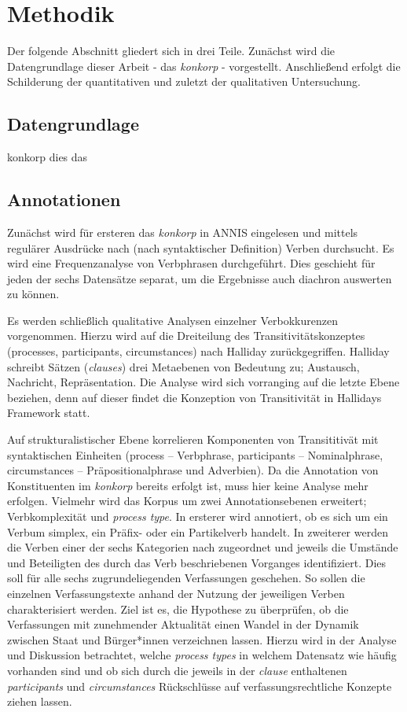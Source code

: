 \section{Methodik}
\label{sec:3}

Der folgende Abschnitt gliedert sich in drei Teile. Zunächst wird die Datengrundlage dieser Arbeit - das \textit{konkorp} - vorgestellt. Anschließend erfolgt die Schilderung der quantitativen und zuletzt der qualitativen Untersuchung.

\subsection{Datengrundlage}\label{sec:3:konkorp}
 konkorp dies das


\subsection{Annotationen}

Zunächst wird für ersteren das \textit{konkorp} in ANNIS eingelesen und mittels regulärer Ausdrücke nach (nach syntaktischer Definition) Verben durchsucht. Es wird eine Frequenzanalyse von Verbphrasen durchgeführt. Dies geschieht für jeden der sechs Datensätze separat, um die Ergebnisse auch diachron auswerten zu können.

Es werden schließlich qualitative Analysen einzelner Verbokkurenzen vorgenommen. Hierzu wird auf die Dreiteilung des Transitivitätskonzeptes (processes, participants, circumstances) nach Halliday zurückgegriffen.
Halliday schreibt Sätzen (\textit{clauses}) drei Metaebenen von Bedeutung zu; Austausch, Nachricht, Repräsentation. Die Analyse wird sich vorranging auf die letzte Ebene beziehen, denn auf dieser findet die Konzeption von Transitivität in Hallidays Framework statt.

Auf strukturalistischer Ebene korrelieren Komponenten von Transititivät mit syntaktischen Einheiten (process -- Verbphrase, participants -- Nominalphrase, circumstances -- Präpositionalphrase und Adverbien). Da die Annotation von Konstituenten im \textit{konkorp} bereits erfolgt ist, muss hier keine Analyse mehr erfolgen.
Vielmehr wird das Korpus um zwei Annotationsebenen erweitert; Verbkomplexität und \textit{process type}. In ersterer wird annotiert, ob es sich um ein Verbum simplex, ein Präfix- oder ein Partikelverb handelt. In zweiterer werden die Verben einer der sechs Kategorien nach \citet[171]{Halliday2004} zugeordnet und jeweils die Umstände und Beteiligten des durch das Verb beschriebenen Vorganges identifiziert. Dies soll für alle sechs zugrundeliegenden Verfassungen geschehen. So sollen die einzelnen Verfassungstexte anhand der Nutzung der jeweiligen Verben charakterisiert werden. Ziel ist es, die Hypothese zu überprüfen, ob die Verfassungen mit zunehmender Aktualität einen Wandel in der Dynamik zwischen Staat und Bürger*innen verzeichnen lassen. Hierzu wird in der Analyse und Diskussion betrachtet, welche \textit{process types} in welchem Datensatz wie häufig vorhanden sind und ob sich durch die jeweils in der \textit{clause} enthaltenen \textit{participants} und \textit{circumstances} Rückschlüsse auf verfassungsrechtliche Konzepte ziehen lassen.

